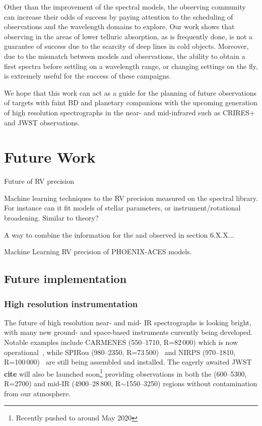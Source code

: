 Other than the improvement of the spectral models, the observing community can increase their odds of success by paying attention to the scheduling of observations and the wavelength domains to explore.
Our work shows that observing in the areas of lower telluric absorption, as is frequently done, is not a guarantee of success due to the scarcity of deep lines in cold objects.
Moreover, due to the mismatch between models and observations, the ability to obtain a first spectra before settling on a wavelength range, or changing settings on the fly, is extremely useful for the success of these campaigns.

We hope that this work can act as a guide for the planning of future observations of targets with faint {BD} and planetary companions with the upcoming generation of high resolution spectrographs in the near- and mid-infrared such as {CRIRES+} and JWST observations.





\section{Future Work}

Future of {RV} precision

Machine learning techniques to the RV precision measured on the spectral library.
For instance can it fit models of stellar parameters, or instrument/rotational broadening.
Similar to theory?


A way to combine the information for the \logg{} and \feh{} observed in section 6.X.X...


Machine Learning RV precision of {PHOENIX-ACES} models.







\subsection{Future implementation}
\label{subsec:future}
\subsubsection{High resolution instrumentation}
\label{subsubsec:highres}
The future of high resolution near- and mid- IR spectrographs is looking bright, with many new ground- and space-based instruments currently being developed.
Notable examples include CARMENES (550--1710\nm{},  R=82\,000) which is now operational~\citep{quirrenbach_carmenes_2014}, while SPIRou (980--2350\nm{},  R=73\,500)~\cite{artigau_spirou_2014} and NIRPS (970--1810\nm{}, R=100\,000)~\cite{bouchy_nearinfrared_2017} are still being assembled and installed.
The eagerly awaited {JWST} \textbf{cite} will also be launched soon\footnote{Recently pushed to around May 2020} providing observations in both the \nir{} (600--5300\nm{}, R=2700) and mid-IR (4900--28\,800\nm{}, R$\sim$1550--3250) regions without contamination from \textrm{our} atmosphere.

